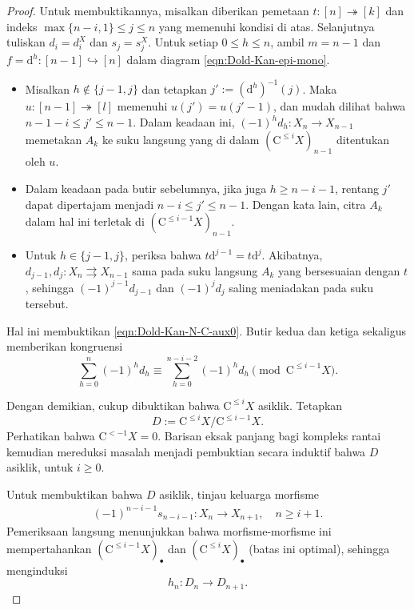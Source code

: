 \begin{proof}
	Untuk membuktikannya, misalkan diberikan pemetaan
	$t:[n]\twoheadrightarrow[k]$ dan indeks
	$\max\{n-i,1\}\leq j\leq n$ yang memenuhi kondisi di atas. Selanjutnya
	tuliskan $d_i=d_i^X$ dan $s_j=s_j^X$. Untuk setiap $0\leq h\leq n$, ambil
	$m=n-1$ dan $f=\mathrm{d}^h:[n-1]\hookrightarrow[n]$ dalam diagram
	\eqref{eqn:Dold-Kan-epi-mono}.
	\begin{itemize}
		\item Misalkan $h\notin\{j-1,j\}$ dan tetapkan
		$j':=(\mathrm{d}^h)^{-1}(j)$. Maka
		$u:[n-1]\twoheadrightarrow[l]$ memenuhi $u(j')=u(j'-1)$, dan mudah
		dilihat bahwa $n-1-i\leq j'\leq n-1$. Dalam keadaan ini,
		$(-1)^hd_h:X_n\to X_{n-1}$ memetakan $A_k$ ke suku langsung yang
		di dalam $(\mathrm{C}^{\leq i}X)_{n-1}$ ditentukan oleh $u$.
		\item Dalam keadaan pada butir sebelumnya, jika juga
		$h\geq n-i-1$, rentang $j'$ dapat dipertajam menjadi
		$n-i\leq j'\leq n-1$. Dengan kata lain, citra $A_k$ dalam hal ini
		terletak di $(\mathrm{C}^{\leq i-1}X)_{n-1}$.
		\item Untuk $h\in\{j-1,j\}$, periksa bahwa
		$t\mathrm{d}^{j-1}=t\mathrm{d}^j$. Akibatnya,
		$d_{j-1},d_j:X_n\rightrightarrows X_{n-1}$ sama pada suku langsung
		$A_k$ yang bersesuaian dengan $t$, sehingga
		$(-1)^{j-1}d_{j-1}$ dan $(-1)^jd_j$ saling meniadakan pada suku
		tersebut.
	\end{itemize}
	Hal ini membuktikan \eqref{eqn:Dold-Kan-N-C-aux0}. Butir kedua dan ketiga
	sekaligus memberikan kongruensi
	\begin{equation}\label{eqn:Dold-Kan-N-C-aux}
		\sum_{h=0}^n (-1)^h d_h \equiv \sum_{h=0}^{n-i-2} (-1)^h d_h \pmod{ \mathrm{C}^{\leq i-1} X }.
	\end{equation}

	Dengan demikian, cukup dibuktikan bahwa
	$\mathrm{C}^{\leq i}X$ asiklik. Tetapkan
	\[ D:=\mathrm{C}^{\leq i}X/\mathrm{C}^{\leq i-1}X. \]
	Perhatikan bahwa $\mathrm{C}^{<-1}X=0$. Barisan eksak panjang bagi kompleks
	rantai kemudian mereduksi masalah menjadi pembuktian secara induktif bahwa
	$D$ asiklik, untuk $i\geq0$.

	Untuk membuktikan bahwa $D$ asiklik, tinjau keluarga morfisme
	\begin{gather*}
		(-1)^{n-i-1}s_{n-i-1}:X_n\to X_{n+1}, \quad n\geq i+1.
	\end{gather*}
	Pemeriksaan langsung menunjukkan bahwa morfisme-morfisme ini mempertahankan
	$(\mathrm{C}^{\leq i-1}X)_\bullet$ dan
	$(\mathrm{C}^{\leq i}X)_\bullet$ (batas ini optimal), sehingga
	menginduksi
	\[ h_n:D_n\to D_{n+1}. \]


\end{proof}
